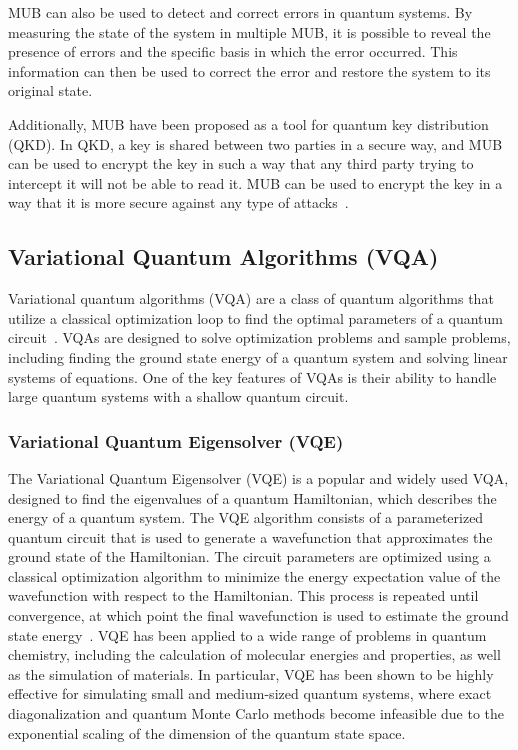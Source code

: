 MUB can also be used to detect and correct errors in quantum systems.
By measuring the state of the system in multiple MUB,
it is possible to reveal the presence of errors and the specific basis in which the error occurred.
This information can then be used to correct the error and restore the system to its original state.

Additionally, MUB have been proposed as a tool for quantum key distribution (QKD). In QKD,
a key is shared between two parties in a secure way, and MUB can be used to encrypt the key in such a way that any
third party trying to intercept it will not be able to read it.
MUB can be used to encrypt the key in a way that it is more secure against any type of attacks~\cite{wootters1989optimal}.

\subsection{Variational Quantum Algorithms (VQA)}\label{subsec:variational-quantum-algorithms}
Variational quantum algorithms (VQA) are a class of quantum algorithms that utilize a classical optimization loop to
find the optimal parameters of a quantum circuit~\cite{cerezo2021variational}.
VQAs are designed to solve optimization problems and sample problems,
including finding the ground state energy of a quantum system and solving linear systems of equations. One of the key features
of VQAs is their ability to handle large quantum systems with a shallow quantum circuit.

\subsubsection{Variational Quantum Eigensolver (VQE)}
The Variational Quantum Eigensolver (VQE) is a popular and widely used VQA, designed to find the eigenvalues of a quantum Hamiltonian,
which describes the energy of a quantum system. The VQE algorithm consists of a parameterized quantum circuit that is used to generate a
wavefunction that approximates the ground state of the Hamiltonian. The circuit parameters are optimized using a classical optimization
algorithm to minimize the energy expectation value of the wavefunction with respect to the Hamiltonian. This process is repeated until convergence,
at which point the final wavefunction is used to estimate the ground state energy~\cite{peruzzo2014variational}.
VQE has been applied to a wide range of problems in quantum chemistry, including the calculation of molecular energies
and properties, as well as the simulation of materials. In particular, VQE has been shown to be highly effective for
simulating small and medium-sized quantum systems, where exact diagonalization and quantum Monte Carlo methods become infeasible
due to the exponential scaling of the dimension of the quantum state space.

